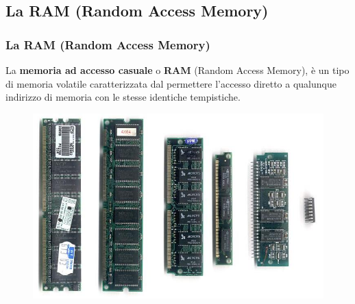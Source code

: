 \subsection[La RAM (Random Access Memory)]{La RAM (Random Access Memory)}
\begin{frame}
	\frametitle{La RAM (Random Access Memory)}
	  
	\begin{block}{}
		La \textbf{memoria ad accesso casuale} o \textbf{RAM} (Random Access Memory), è un tipo di memoria volatile caratterizzata dal permettere l'accesso diretto a qualunque indirizzo di memoria con le stesse identiche tempistiche.
		
		\begin{figure}[!htbp]
			\centering
			\includegraphics[width=0.58\linewidth]{images/5_memory/ram.jpg}
			\label{fig:memory_ram}
		\end{figure}
	\end{block}
\end{frame}


